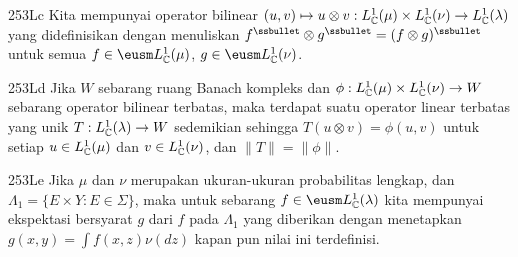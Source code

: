 \spheader 253Lc Kita mempunyai operator bilinear $(u,v)\mapsto u\otimes v:
L^1_{\Bbb C}(\mu)\times L^1_{\Bbb C}(\nu)\to L^1_{\Bbb C}(\lambda)$
yang didefinisikan dengan menuliskan $f^{\ssbullet}\otimes g^{\ssbullet}=(f\otimes
g)^{\ssbullet}$ untuk semua
$f\in\eusm L^1_{\Bbb C}(\mu)$, $g\in \eusm
L^1_{\Bbb C}(\nu)$.

\spheader 253Ld Jika $W$ sebarang ruang Banach kompleks dan
$\phi:L^1_{\Bbb C}(\mu)\times L^1_{\Bbb C}(\nu)\to W$ sebarang operator
bilinear terbatas, maka terdapat suatu operator linear terbatas yang unik
$T:L^1_{\Bbb C}(\lambda)\to W$ sedemikian sehingga
$T(u\otimes v)=\phi(u,v)$ untuk setiap $u\in L^1_{\Bbb C}(\mu)$ dan
$v\in L^1_{\Bbb C}(\nu)$, dan $\|T\|=\|\phi\|$.

\spheader 253Le Jika $\mu$ dan $\nu$ merupakan ukuran-ukuran probabilitas
lengkap, dan $\Lambda_1=\{E\times Y:E\in\Sigma\}$, maka untuk sebarang
$f\in\eusm
L^1_{\Bbb C}(\lambda)$ kita mempunyai ekspektasi bersyarat
$g$ dari $f$ pada $\Lambda_1$ yang diberikan dengan menetapkan
$g(x,y)=\int f(x,z)\nu(dz)$ kapan pun nilai ini terdefinisi.

